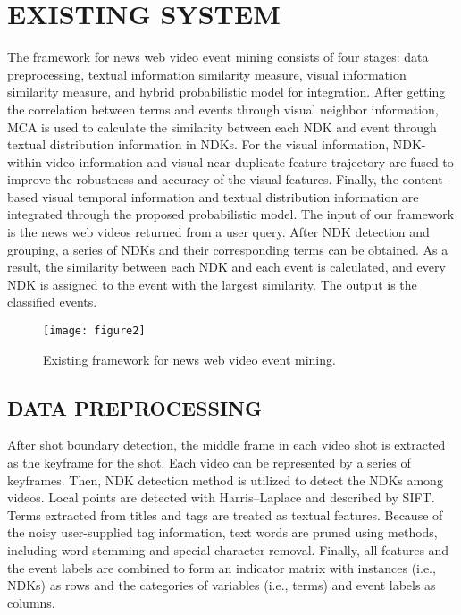 

\chapter{EXISTING SYSTEM}
The framework for news web video event mining consists of four stages: data preprocessing, textual information similarity measure, visual information similarity measure, and hybrid probabilistic model for integration. After getting the correlation between terms and events through visual neighbor information, MCA is used to calculate the similarity between each NDK and event through textual distribution information in NDKs. For the visual information, NDK-within video information and visual near-duplicate feature trajectory are fused to improve the robustness and accuracy of the visual features. Finally, the content-based visual temporal information and textual distribution information are integrated through the proposed probabilistic model. The input of our framework is the news web videos returned from a user query. After NDK detection and grouping, a series of NDKs and their corresponding terms can be obtained. As a result, the similarity between each NDK and each event is calculated, and every NDK is assigned to the event with the largest similarity. The output is the classiﬁed events.

\begin{figure}[H]
	\centering
	\texttt{[image: figure2]}
	\caption{Existing framework for news web video event mining.}
	\label{fig:Existing framework for news web video event mining}
\end{figure}



\section{DATA PREPROCESSING}
After shot boundary detection, the middle frame in each video shot is extracted as the keyframe for the shot. Each video can be represented by a series of keyframes. Then, NDK detection method is utilized to detect the NDKs among videos. Local points are detected with Harris–Laplace and described by SIFT.\\

Terms extracted from titles and tags are treated as textual features. Because of the noisy user-supplied tag information, text words are pruned using methods, including word stemming and special character removal. Finally, all features and the event labels are combined to form an indicator matrix with instances (i.e., NDKs) as rows and the categories of variables (i.e., terms) and event labels as columns.
 
